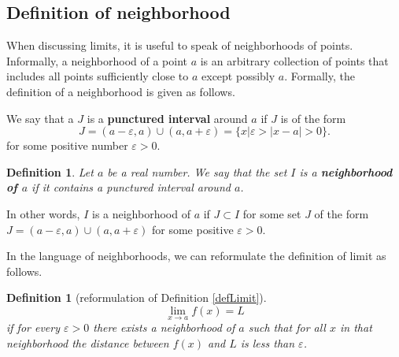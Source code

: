 \documentclass[12pt]{book}
\newtheorem{definition}[theorem]{Definition}
\renewcommand{\emph}{\textbf}
\begin{document}
\subsection{Definition of neighborhood}
When discussing limits, it is useful to speak of neighborhoods of points. Informally, a neighborhood of a point $a$ is an arbitrary collection of points that  includes all points sufficiently close to $a$ except possibly $a$. Formally, the definition of a neighborhood is given as follows.

We say that a $J$ is a \emph{punctured interval} around $a$ if $J$ is of the form
\[
J= (a-\varepsilon,a)\cup (a, a+\varepsilon)=\{x| \varepsilon>|x-a|>0\}.
\]
for some positive number $\varepsilon>0$.
\begin{definition}
Let $a$ be a real number. We say that the set $I$ is a \emph{neighborhood of $a$} if it contains a punctured interval around $a$.
\end{definition}
In other words,  $I$  is a neighborhood of $a$  if $J\subset I$ for some set $J$ of the form $ J= (a-\varepsilon,a)\cup (a, a+\varepsilon)$ for some positive $\varepsilon>0$.

In the language of neighborhoods, we can reformulate the definition of limit as follows.

\begin{definition}[reformulation of Definition \ref{defLimit}]
\[\lim\limits_{x\to a} f(x)=L
\]
if for every $\varepsilon>0$ there exists a neighborhood of $a$ such that for all $x$ in that neighborhood the distance between $f(x)$ and $L$ is less than $\varepsilon$.
\end{definition}
\end{document}
